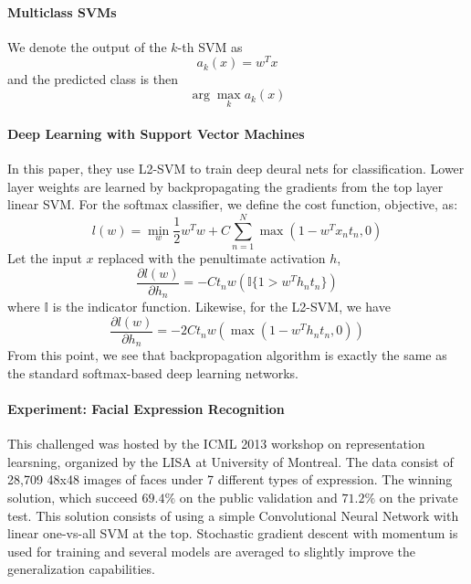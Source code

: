 \documentclass{article}
\begin{document}
\paragraph{Multiclass SVMs} We denote the output of the $k$-th SVM as
\begin{equation*}
	a_k(x) = w^Tx
\end{equation*}
and the predicted class is then
\begin{equation*}
	\arg \max_{k} a_k(x)
\end{equation*}

\paragraph{Deep Learning with Support Vector
Machines}
In this paper, they use L2-SVM to train deep deural nets for classification. Lower layer weights are learned by backpropagating the gradients from the top layer linear SVM. For the softmax classifier, we define the cost function, objective, as:
\begin{equation*}
	l(w) = \min_w \frac{1}{2}w^Tw + C\sum_{n=1}^{N}\max(1 - w^T x_n t_n,0)
\end{equation*}
Let the input $x$ replaced with the penultimate activation $h$,
\begin{equation*}
	\frac{\partial l(w)}{\partial h_n} = -Ct_n w\left(\mathbb{I}\{1 > w^Th_nt_n\}\right)
\end{equation*}
where $\mathbb{I{}}$ is the indicator function. Likewise, for the L2-SVM, we have
\begin{equation*}
	\frac{\partial l(w)}{\partial h_n} = -2Ct_n w\left(\max(1 - w^T h_n t_n, 0)\right)
\end{equation*}
From this point, we see that backpropagation algorithm is exactly the same as the standard softmax-based deep learning networks.

\paragraph{Experiment: Facial Expression Recognition} This challenged was hosted by the ICML 2013 workshop on representation learsning, organized by the LISA at University of Montreal. The data consist of 28,709 48x48 images of faces under 7 different types of expression. The winning solution, which succeed $69.4\%$ on the public validation and $71.2\%$ on the private test. This solution consists of using a simple Convolutional Neural Network with linear one-vs-all SVM at the top. Stochastic gradient descent with momentum is used for training and several models are averaged to slightly improve the generalization capabilities.  
\end{document}
